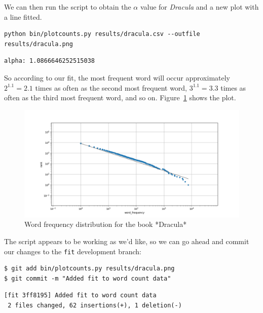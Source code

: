\documentclass[
]{krantz}
\begin{document}
We can then run the script to obtain the \(\alpha\) value for \emph{Dracula}
and a new plot with a line fitted.

\begin{verbatim}
python bin/plotcounts.py results/dracula.csv --outfile results/dracula.png
\end{verbatim}

\begin{verbatim}
alpha: 1.0866646252515038
\end{verbatim}

So according to our fit,
the most frequent word will occur approximately \(2^{1.1}=2.1\) times
as often as the second most frequent word,
\(3^{1.1}=3.3\) times as often as the third most frequent word, and so on.
Figure~\ref{fig:git-advanced-dracula-fit} shows the plot.

\begin{figure}

{\centering \includegraphics[width=1\linewidth]{figures/git-advanced/dracula-fit} 

}

\caption{Word frequency distribution for the book *Dracula*}\label{fig:git-advanced-dracula-fit}
\end{figure}

The script appears to be working as we'd like,
so we can go ahead and commit our changes to the \texttt{fit} development branch:

\begin{verbatim}
$ git add bin/plotcounts.py results/dracula.png
$ git commit -m "Added fit to word count data"
\end{verbatim}

\begin{verbatim}
[fit 3ff8195] Added fit to word count data
 2 files changed, 62 insertions(+), 1 deletion(-)
\end{verbatim}
\end{document}
